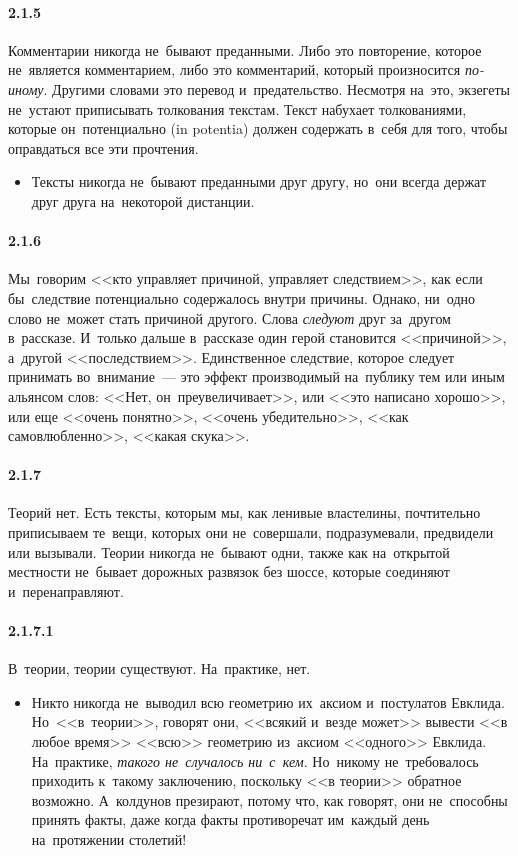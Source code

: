 \paragraph{2.1.5}\hypertarget{par:2.1.5}{} Комментарии никогда не~бывают преданными. Либо это повторение, которое не~является комментарием, либо это комментарий, который произносится {\itshape по-иному}. Другими словами это перевод и~предательство. Несмотря на~это, экзегеты не~устают приписывать толкования текстам. Текст набухает толкованиями, которые он~потенциально (in potentia) должен содержать в~себя для того, чтобы оправдаться все эти прочтения. 
	\begin{itemize}
	\item 
	Тексты никогда не~бывают преданными друг другу, но~они всегда держат друг друга на~некоторой дистанции.
	\end{itemize}

\paragraph{2.1.6}\hypertarget{par:2.1.6}{} Мы~говорим <<кто управляет причиной, управляет следствием>>, как если бы~следствие потенциально содержалось внутри причины. Однако, ни~одно слово не~может стать причиной другого. Слова {\itshape следуют} друг за~другом в~рассказе. И~только дальше в~рассказе один герой становится <<причиной>>, а~другой <<последствием>>. Единственное следствие, которое следует принимать во~внимание~--- это эффект производимый на~публику тем или иным альянсом слов: <<Нет, он~преувеличивает>>, или <<это написано хорошо>>, или еще <<очень понятно>>, <<очень убедительно>>, <<как самовлюбленно>>, <<какая скука>>.

\paragraph{2.1.7}\hypertarget{par:2.1.7}{} Теорий нет. Есть тексты, которым мы, как ленивые властелины, почтительно приписываем те~вещи, которых они не~совершали, подразумевали, предвидели или вызывали. Теории никогда не~бывают одни, также как на~открытой местности не~бывает дорожных развязок без шоссе, которые соединяют и~перенаправляют.

\paragraph{2.1.7.1}\hypertarget{par:2.1.7.1}{} В~теории, теории существуют. На~практике, нет. 
	\begin{itemize}
	\item 
	Никто никогда не~выводил всю геометрию их~аксиом и~постулатов Евклида. Но~<<в~теории>>, говорят они, <<всякий и~везде может>> вывести <<в любое время>> <<всю>> геометрию из~аксиом <<одного>> Евклида. На~практике, {\itshape такого не~случалось ни~с~кем}. Но~никому не~требовалось приходить к~такому заключению, поскольку <<в теории>> обратное возможно. А~колдунов презирают, потому что, как говорят, они не~способны принять факты, даже когда факты противоречат им~каждый день на~протяжении столетий!
	\end{itemize}

